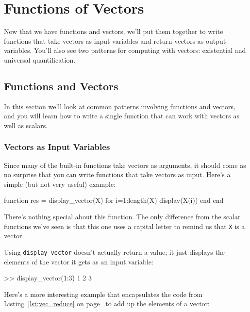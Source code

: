 \documentclass[../../book.tex]{subfiles}
\begin{document}
\chapter{Functions of Vectors}


Now that we have functions and vectors, we'll put them together to write functions that take vectors as input variables and return vectors as output variables.  You'll also see two patterns for computing with vectors: existential and universal quantification.


\section{Functions and Vectors}

In this section we'll look at common patterns involving functions and vectors, and you will learn how to write a single function that can work with \mbox{vectors} as well as scalars.

\subsection{Vectors as Input Variables}

Since many of the built-in functions take vectors as arguments,
it should come as no surprise that you can write functions that
take vectors as input.  Here's a simple (but not very useful) example:


\begin{code}
function res = display_vector(X)
    for i=1:length(X)
        display(X(i))
    end
end
\end{code}

There's nothing special about this function.  The only
difference from the scalar functions we've seen is that this one uses
a capital letter to remind us that \lstinline{X} is a vector.

Using \lstinline{display_vector} doesn't actually return a value; it just displays the elements of the vector it gets as an input variable:

\begin{code}
>> display_vector(1:3)
    1
    2
    3
\end{code}

Here's a more interesting example that encapsulates the code
from Listing~\ref{lst:vec_reduce} on page~\pageref{lst:vec_reduce} to add up the elements of a vector:

\end{document}
